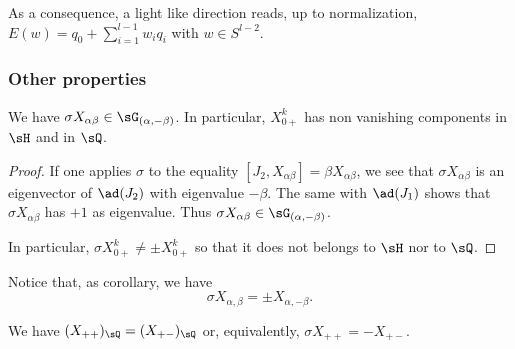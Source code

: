 \begin{remark}	\label{LONGRemOrdreNilpotentQ}
	As a consequence, a light like direction reads, up to normalization, $E(w)=q_0+\sum_{i=1}^{l-1}w_iq_i$ with $w\in S^{l-2}$.
\end{remark}

%
\subsubsection{Other properties}
%


\begin{lemma}		\label{LONGLemXZUAHetQ}
	We have $\sigma X_{\alpha\beta}\in\sG_{(\alpha,-\beta)}$. In particular, $X^k_{0+}$ has non vanishing components in $\sH$ and in $\sQ$.
\end{lemma}

\begin{proof}
	If one applies $\sigma$ to the equality $[J_2,X_{\alpha\beta}]=\beta X_{\alpha\beta}$, we see that $\sigma X_{\alpha\beta}$ is an eigenvector of $\ad(J_2)$ with eigenvalue $-\beta$. The same with $\ad(J_1)$ shows that $\sigma X_{\alpha\beta}$ has $+1$ as eigenvalue. Thus $\sigma X_{\alpha\beta}\in\sG_{(\alpha,-\beta)}$.

	In particular, $\sigma X^k_{0+}\neq \pm X^k_{0+}$ so that it does not belongs to $\sH$ nor to $\sQ$.
\end{proof}

Notice that, as corollary, we have
\begin{equation}
	\sigma X_{\alpha,\beta}=\pm X_{\alpha,-\beta}.
\end{equation}


\begin{lemma}				\label{LONGLemSigmaXppEgalXPm}
	We have $(X_{++})_{\sQ}=(X_{+-})_{\sQ}$ or, equivalently, $\sigma X_{++}=-X_{+-}$.
\end{lemma}

